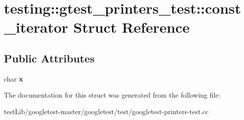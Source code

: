 \hypertarget{structtesting_1_1gtest__printers__test_1_1const__iterator}{}\section{testing\+:\+:gtest\+\_\+printers\+\_\+test\+:\+:const\+\_\+iterator Struct Reference}
\label{structtesting_1_1gtest__printers__test_1_1const__iterator}
\subsection*{Public Attributes}
\begin{DoxyCompactItemize}
\item 
\mbox{\label{structtesting_1_1gtest__printers__test_1_1const__iterator_a4412dbc1c37c2bc5211971f0c8176d6b}} 
char {\bfseries x}
\end{DoxyCompactItemize}


The documentation for this struct was generated from the following file\+:\begin{DoxyCompactItemize}
\item 
test\+Lib/googletest-\/master/googletest/test/googletest-\/printers-\/test.\+cc\end{DoxyCompactItemize}
